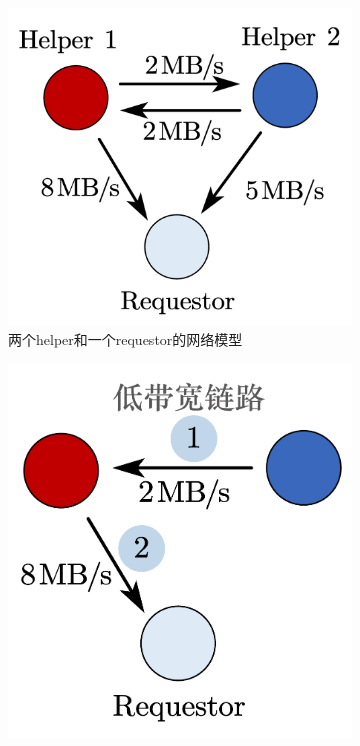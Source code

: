 \begin{figure}[tb!]
    \centering
    \begin{subfigure}[t]{0.4\textwidth}
           \centering
           \includegraphics[scale=0.25]{figures/2.3-1.pdf}
            \caption{两个helper和一个requestor的网络模型}
            \label{fig:2.3-1}
    \end{subfigure}
    \begin{subfigure}[t]{0.4\textwidth}
            \centering
            \includegraphics[scale=0.25]{figures/2.3-2.pdf}

\end{subfigure}
\end{figure}
